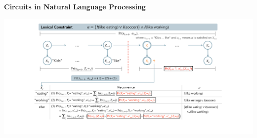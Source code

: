 \documentclass[aspectratio=169]{beamer}
\begin{document}
\begin{frame}[fragile]{\textbf{Circuits in Natural Language Processing}}

\begin{center}
  \includegraphics[height=0.7\textheight]{figures/gelato.pdf}
\end{center}

\textcolor{dark gray}{\scriptsize\citep{zhang23}}

\end{frame}

\end{document}
